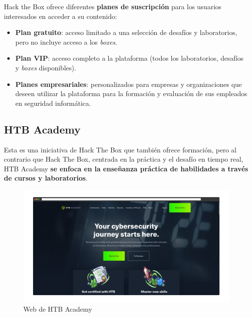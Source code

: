         Hack the Box ofrece diferentes \textbf{planes de suscripción} para los usuarios interesados en acceder a su contenido:
        
        \begin{itemize}
            \item \textbf{Plan gratuito}: acceso limitado a una selección de desafíos y laboratorios, pero no incluye acceso a los \textit{boxes}.
        
            \item \textbf{Plan VIP}: acceso completo a la plataforma (todos los laboratorios, desafíos y \textit{boxes} disponibles).
        
            \item \textbf{Planes empresariales}: personalizados para empresas y organizaciones que deseen utilizar la plataforma para la formación y evaluación de sus empleados en seguridad informática.
        \end{itemize}
        
        \newpage

    
    \subsection{HTB Academy}
    
        Esta es una iniciativa de Hack The Box que también ofrece formación, pero al contrario que Hack The Box, centrada en la práctica y el desafío en tiempo real, HTB Academy \textbf{se enfoca en la enseñanza práctica de habilidades a través de cursos y laboratorios}.
        
        \begin{figure}[h]
            \centering

            \includegraphics[width=\textwidth]{images/Capturas/Web de HTB Academy.png}
            
            \caption{Web de HTB Academy}
            \label{fig:HTB-Academy-web}
        \end{figure}
        
